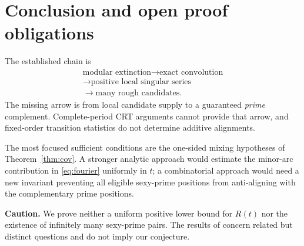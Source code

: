 \documentclass[11pt,a4paper]{article}
\theoremstyle{definition}
\begin{document}
\section{Conclusion and open proof obligations}

The established chain is
\[
\begin{gathered}
 \text{modular extinction} \longrightarrow \text{exact convolution}\\
 \longrightarrow \text{positive local singular series}\\
 \longrightarrow \text{many rough candidates}.
\end{gathered}
\]
The missing arrow is from local candidate supply to a guaranteed
\emph{prime} complement. Complete-period CRT arguments cannot provide
that arrow, and fixed-order transition statistics do not determine
additive alignments.

The most focused sufficient conditions are the one-sided mixing
hypotheses of Theorem~\ref{thm:cov}. A stronger analytic approach
would estimate the minor-arc contribution in \eqref{eq:fourier}
uniformly in $t$; a combinatorial approach would need a new invariant
preventing all eligible sexy-prime positions from anti-aligning with
the complementary prime positions.

\noindent\textbf{Caution.} We prove neither a uniform positive lower
bound for $R(t)$ nor the existence of infinitely many sexy-prime pairs.
The results of \cite{Pandey2026,Radomskii2026,Akeno2025} concern
related but distinct questions and do not imply our conjecture.



\end{document}
